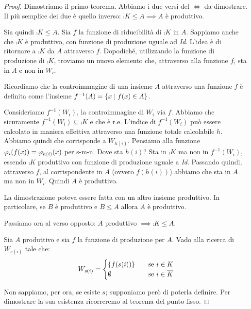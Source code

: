 \begin{proof}
    Dimostriamo il primo teorema. Abbiamo i due versi del $\iff$ da dimostrare. Il più semplice dei due è
    quello inverso: $\comp{K} \leq A \implies A$ è produttivo.

    Sia quindi $\comp{K} \leq A$. Sia $f$ la funzione di riducibilità di $\comp{K}$ in $A$. Sappiamo anche che
    $\comp{K}$ è produttivo, con funzione di produzione uguale ad \textit{Id}. L'idea è di ritornare a
    $\comp{K}$ da $A$ attraverso $f$. Dopodiché, utilizzando la funzione di produzione di
    $\comp{K}$,
    troviamo un nuovo elemento che, attraverso alla funzione $f$, sta in $A$ e non in $W_{i}$.

    Ricordiamo che la controimmagine di una insieme $A$ attraverso una funzione $f$ è definita come
    l'insieme $f^{-1}(A) = \left\{x \mid f(x) \in A\right\}$.

    Consideriamo $f^{-1}(W_{i})$, la controimmagine di $W_{i}$ via $f$. Abbiamo che sicuramente
    $f^{-1}(W_{i}) \subseteq \comp{K}$ e che è r.e. L'indice di $f^{-1}(W_{i})$ può essere calcolato
    in maniera effettiva attraverso una funzione totale calcolabile $h$.  Abbiamo quindi che
    corrisponde a $W_{h(i)}$. Pensiamo alla funzione $\varphi_{i}(f(x)) = \varphi_{h(i)}(x)$ per s-m-n. Dove
    sta $h(i)$?  Sta in $\comp{K}$ ma non in $f^{-1}(W_{i})$, essendo $\comp{K}$ produttivo con
    funzione di produzione uguale a \textit{Id}. Passando quindi, attraverso $f$, al corrispondente
    in $A$ (ovvero $f(h(i))$) abbiamo che sta in $A$ ma non in $W_{i}$. Quindi $A$ è produttivo.

    La dimostrazione poteva essere fatta con un altro insieme produttivo. In particolare, se $B$ è
    produttivo e $B \leq A$ allora $A$ è produttivo.

    Passiamo ora al verso opposto: $A$ produttivo $\implies \comp{K} \leq A$.

    Sia $A$ produttivo e sia $f$ la funzione di produzione per $A$. Vado alla ricerca di $W_{s(i)}$
    tale che:
    \begin{equation*}
        W_{s(i)} =
        \begin{cases}
            \{f(s(i))\} \quad &\text{se $i \in K$} \\
            \emptyset \quad &\text{se $i \in \overline{K}$}
        \end{cases}
    \end{equation*}

    Non sappiamo, per ora, se esiste $s$; supponiamo però di poterla definire. Per dimostrare la
    sua esistenza ricorreremo al teorema del punto fisso.


\end{proof}
